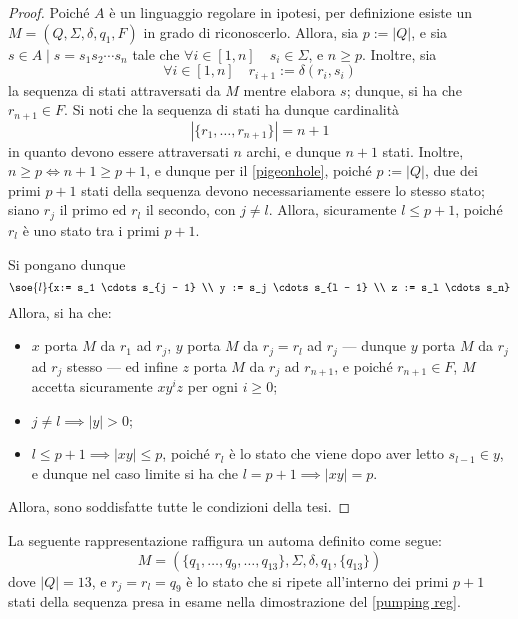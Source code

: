 \documentclass[a4paper, 12pt]{report}
\begin{document}
    \begin{proof}
        Poiché $A$ è un linguaggio regolare in ipotesi, per definizione esiste un \DFA $M = (Q, \Sigma, \delta, q_1, F)$ in grado di riconoscerlo. Allora, sia $p := |Q|$, e sia $s \in A \mid s = s_1 s_2 \cdots s_n$ tale che $\forall i \in [1, n] \quad s_i \in \Sigma$, e $n \ge p$. Inoltre, sia $$\forall i \in [1, n] \quad r_{i + 1} := \delta(r_i, s_i)$$ la sequenza di stati attraversati da $M$ mentre elabora $s$; dunque, si ha che $r_{n + 1} \in F$. Si noti che la sequenza di stati ha dunque cardinalità $$|\{r_1, \ldots, r_{n + 1}\}| = n + 1$$ in quanto devono essere attraversati $n$ archi, e dunque $n + 1$ stati. Inoltre, $n \ge p \iff n + 1 \ge p + 1$, e dunque per il \cref{pigeonhole}, poiché $p := |Q|$, due dei primi $p + 1$ stati della sequenza devono necessariamente essere lo stesso stato; siano $r_j$ il primo ed $r_l$ il secondo, con $j \neq l$. Allora, sicuramente $l \le p + 1$, poiché $r_l$ è uno stato tra i primi $p + 1$.

        Si pongano dunque $$\soe{l}{x:= s_1 \cdots s_{j - 1} \\ y := s_j \cdots s_{l - 1} \\ z := s_l \cdots s_n}$$ Allora, si ha che:

        \begin{itemize}
            \item $x$ porta $M$ da $r_1$ ad $r_j$, $y$ porta $M$ da $r_j = r_l$ ad $r_j$ --- dunque $y$ porta $M$ da $r_j$ ad $r_j$ stesso --- ed infine $z$ porta $M$ da $r_j$ ad $r_{n + 1}$, e poiché $r_{n + 1} \in F$, $M$ accetta sicuramente $xy^iz$ per ogni $i \ge 0$;
            \item $j \neq l \implies |y| > 0$;
            \item $l \le p + 1 \implies |xy| \le p$, poiché $r_l$ è lo stato che viene dopo aver letto $s_{l - 1} \in y$, e dunque nel caso limite si ha che $l = p + 1 \implies |xy| = p$.
        \end{itemize}

        Allora, sono soddisfatte tutte le condizioni della tesi.
    \end{proof}

    \begin{example}
        La seguente rappresentazione raffigura un automa definito come segue: $$M = (\{q_1, \ldots, q_9, \ldots, q_{13}\}, \Sigma, \delta, q_1, \{q_{13}\})$$ dove $|Q| = 13$, e $r_j = r_l = q_9$ è lo stato che si ripete all'interno dei primi $p + 1$ stati della sequenza presa in esame nella dimostrazione del \cref{pumping reg}.

    \end{example}
\end{document}
